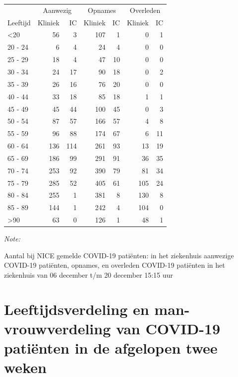 \documentclass[
  english,
  man,floatsintext]{apa6}
\begin{document}
\begin{table}
\centering\begingroup\fontsize{10}{12}\selectfont

\begin{threeparttable}
\begin{tabular}{lrrrrrr}
\toprule
\multicolumn{1}{c}{ } & \multicolumn{2}{c}{Aanwezig} & \multicolumn{2}{c}{Opnames} & \multicolumn{2}{c}{Overleden} \\
\cmidrule(l{3pt}r{3pt}){2-3} \cmidrule(l{3pt}r{3pt}){4-5} \cmidrule(l{3pt}r{3pt}){6-7}
Leeftijd & Kliniek & IC & Kliniek & IC & Kliniek & IC\\
\midrule
<20 & 56 & 3 & 107 & 1 & 0 & 1\\
20 - 24 & 6 & 4 & 24 & 4 & 0 & 0\\
25 - 29 & 18 & 4 & 47 & 10 & 0 & 0\\
30 - 34 & 24 & 17 & 90 & 18 & 0 & 2\\
35 - 39 & 26 & 16 & 76 & 20 & 0 & 0\\
40 - 44 & 33 & 18 & 85 & 18 & 1 & 1\\
45 - 49 & 45 & 44 & 100 & 45 & 0 & 3\\
50 - 54 & 87 & 57 & 166 & 57 & 4 & 8\\
55 - 59 & 96 & 88 & 174 & 67 & 6 & 11\\
60 - 64 & 136 & 114 & 261 & 93 & 13 & 19\\
65 - 69 & 186 & 99 & 291 & 91 & 36 & 35\\
70 - 74 & 253 & 92 & 390 & 79 & 81 & 34\\
75 - 79 & 285 & 52 & 405 & 61 & 105 & 24\\
80 - 84 & 255 & 1 & 381 & 8 & 130 & 8\\
85 - 89 & 144 & 1 & 242 & 4 & 104 & 0\\
>90 & 63 & 0 & 126 & 1 & 48 & 1\\
\bottomrule
\end{tabular}
\begin{tablenotes}
\item \textit{Note: } 
\item Aantal bij NICE gemelde COVID-19 patiënten: in het ziekenhuis aanwezige COVID-19 patiënten, opnames, en overleden COVID-19 patiënten in het ziekenhuis van 06 december t/m 20 december 15:15 uur
\end{tablenotes}
\end{threeparttable}
\endgroup{}
\end{table}

\newpage

\hypertarget{leeftijdsverdeling-en-man-vrouwverdeling-van-covid-19-patiuxebnten-in-de-afgelopen-twee-weken}{%
\section{Leeftijdsverdeling en man-vrouwverdeling van COVID-19 patiënten in de afgelopen twee weken}\label{leeftijdsverdeling-en-man-vrouwverdeling-van-covid-19-patiuxebnten-in-de-afgelopen-twee-weken}}
\end{document}
